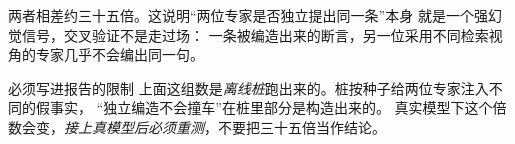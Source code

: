 两者相差约三十五倍。这说明“两位专家是否独立提出同一条”本身
就是一个强幻觉信号，交叉验证不是走过场：
一条被编造出来的断言，另一位采用不同检索视角的专家几乎不会编出同一句。

\begin{keynote}{必须写进报告的限制}
上面这组数是\emph{离线桩}跑出来的。桩按种子给两位专家注入不同的假事实，
“独立编造不会撞车”在桩里部分是构造出来的。
真实模型下这个倍数会变，\emph{接上真模型后必须重测}，不要把三十五倍当作结论。
\end{keynote}



